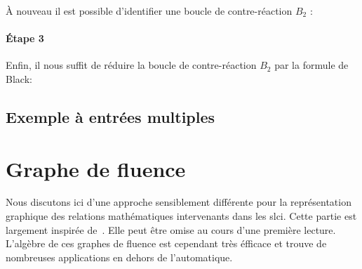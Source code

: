 \`A nouveau il est possible d'identifier une boucle de contre-réaction $B_2$ :

\begin{center}                                                                                                                
\end{center}                                                                                                                  

\paragraph{\'Etape 3}

Enfin, il nous suffit de réduire la boucle de contre-réaction $B_2$ par la formule de Black:

\begin{center}
\end{center}

\subsection{Exemple à entrées multiples}
\acpl
\newpage

\section{Graphe de fluence}
Nous discutons ici d'une approche sensiblement différente 
pour la représentation graphique des relations mathématiques 
intervenants dans les \gls{slci}. Cette partie est largement
inspirée de~\cite{Ostertag}. Elle peut être omise au cours 
d'une première lecture. L'algèbre de ces graphes de fluence
est cependant très éfficace et trouve de nombreuses applications 
en dehors de l'automatique. 

